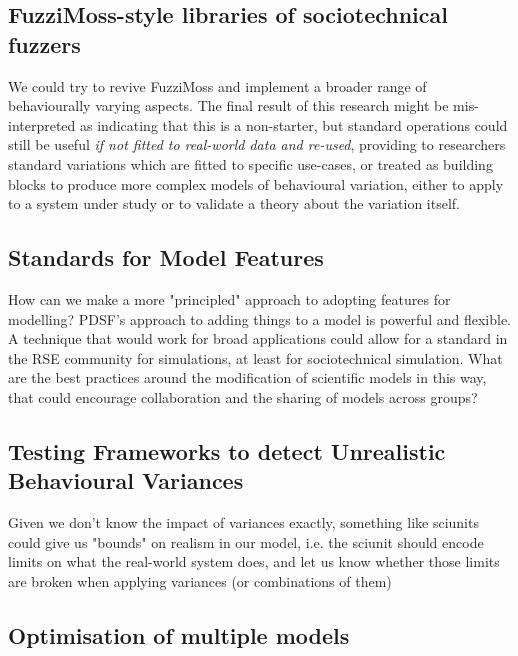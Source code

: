 \subsection{FuzziMoss-style libraries of sociotechnical
fuzzers}\label{future_work_revive_fuzzimoss}

We could try to revive FuzziMoss and implement a broader range of behaviourally
varying aspects. The final result of this research might be mis-interpreted as
indicating that this is a non-starter, but standard operations could still be
useful \emph{if not fitted to real-world data and re-used}, providing to
researchers standard variations which are fitted to specific use-cases, or
treated as building blocks to produce more complex models of behavioural
variation, either to apply to a system under study or to validate a theory about
the variation itself.


\subsection{Standards for Model Features}\label{subsec:standard_aosm_techniques}

How can we make a more "principled" approach to adopting features for modelling?
PDSF's approach to adding things to a model is powerful and flexible. A
technique that would work for broad applications could allow for a standard in
the RSE community for simulations, at least for sociotechnical simulation. What
are the best practices around the modification of scientific models in this way,
that could encourage collaboration and the sharing of models across groups?


\subsection{Testing Frameworks to detect Unrealistic Behavioural Variances}\label{sciunits_for_unrealistic_states}

Given we don't know the impact of variances exactly, something like sciunits
could give us "bounds" on realism in our model, i.e. the sciunit should encode
limits on what the real-world system does, and let us know whether those limits
are broken when applying variances (or combinations of them)


\subsection{Optimisation of multiple models}\label{many_aspectual_models_to_optimise}

